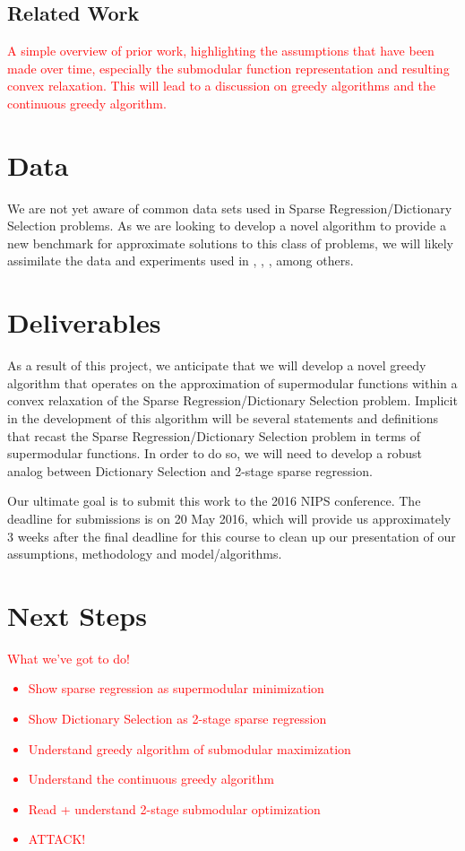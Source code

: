 \documentclass{article}
\begin{document}
\subsection{Related Work}
\textcolor{red}{A simple overview of prior work, highlighting the assumptions that have been made over time, especially the submodular function representation and resulting convex relaxation. This will lead to a discussion on greedy algorithms and the continuous greedy algorithm.}

\section{Data}
We are not yet aware of common data sets used in Sparse Regression/Dictionary Selection problems. As we are looking to develop a novel algorithm to provide a new benchmark for approximate solutions to this class of problems, we will likely assimilate the data and experiments used in  \cite{submod_spectral}, \cite{greedy_selection}, \cite{rIBP}, among others. 

\section{Deliverables} \label{methods}
As a result of this project, we anticipate that we will develop a novel greedy algorithm that operates on the approximation of supermodular functions within a convex relaxation of the Sparse Regression/Dictionary Selection problem. Implicit in the development of this algorithm will be several statements and definitions that recast the Sparse Regression/Dictionary Selection problem in terms of supermodular functions. In order to do so, we will need to develop a robust analog between Dictionary Selection and 2-stage sparse regression.

Our ultimate goal is to submit this work to the 2016 NIPS conference. The deadline for submissions is on 20 May 2016, which will provide us approximately 3 weeks after the final deadline for this course to clean up our presentation of our assumptions, methodology and model/algorithms.

\section{Next Steps} \label{next steps}

\textcolor{red}{What we've got to do!
\begin{itemize}
\item{Show sparse regression as supermodular minimization}
\item{Show Dictionary Selection as 2-stage sparse regression}
\item{Understand greedy algorithm of submodular maximization}
\item{Understand the continuous greedy algorithm}
\item{Read + understand 2-stage submodular optimization}
\item{ATTACK!}
\end{itemize}}
\end{document}
